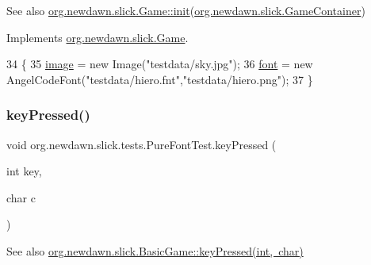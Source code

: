 \begin{DoxySeeAlso}{See also}
\mbox{\hyperlink{interfaceorg_1_1newdawn_1_1slick_1_1_game_ad2dd6affab08bb8fdb5fab0815957b7a}{org.\+newdawn.\+slick.\+Game\+::init}}(\mbox{\hyperlink{classorg_1_1newdawn_1_1slick_1_1_game_container}{org.\+newdawn.\+slick.\+Game\+Container}}) 
\end{DoxySeeAlso}


Implements \mbox{\hyperlink{interfaceorg_1_1newdawn_1_1slick_1_1_game_ad2dd6affab08bb8fdb5fab0815957b7a}{org.\+newdawn.\+slick.\+Game}}.


\begin{DoxyCode}
34                                                                     \{
35         \mbox{\hyperlink{classorg_1_1newdawn_1_1slick_1_1tests_1_1_pure_font_test_abf4f2b16a8b53a263efe45591327f0b0}{image}} = \textcolor{keyword}{new} Image(\textcolor{stringliteral}{"testdata/sky.jpg"});
36         \mbox{\hyperlink{classorg_1_1newdawn_1_1slick_1_1tests_1_1_pure_font_test_a6a077c1e23810818363d7a01a69ddd82}{font}} = \textcolor{keyword}{new} AngelCodeFont(\textcolor{stringliteral}{"testdata/hiero.fnt"},\textcolor{stringliteral}{"testdata/hiero.png"});
37     \}
\end{DoxyCode}
\mbox{\label{classorg_1_1newdawn_1_1slick_1_1tests_1_1_pure_font_test_adec56bd90adaf27d114e39cbb6b3c17b}} 
\subsubsection{\texorpdfstring{key\+Pressed()}{keyPressed()}}
{\footnotesize\ttfamily void org.\+newdawn.\+slick.\+tests.\+Pure\+Font\+Test.\+key\+Pressed (\begin{DoxyParamCaption}\item[{int}]{key,  }\item[{char}]{c }\end{DoxyParamCaption})\hspace{0.3cm}{\ttfamily [inline]}}

\begin{DoxySeeAlso}{See also}
\mbox{\hyperlink{classorg_1_1newdawn_1_1slick_1_1_basic_game_a4fbb3345b5abf5ddd54a99466d07f02f}{org.\+newdawn.\+slick.\+Basic\+Game\+::key\+Pressed(int, char)}} 
\end{DoxySeeAlso}


